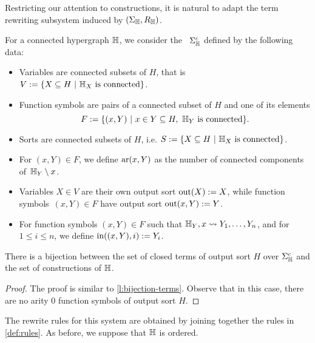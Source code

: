 Restricting our attention to constructions, it is natural to adapt the term rewriting subsystem induced by $(\Sigma_{\mathbb H},R_{\mathbb H})$.

\begin{definition}
  For a connected hypergraph ${\mathbb H}$, we consider the ~$\Sigma_{\mathbb H}^c$ defined by the following data:
  \begin{itemize}
    \item Variables are connected subsets of $H$, that is $V:=\{ X \subseteq H \ | \ \hyper{H}_{X} \text{ is connected}\}$. 
    \item Function symbols are pairs of a connected subset of $H$ and one of its elements 
    $$F:=\{(x,Y) \ | \ x \in Y \subseteq H, \ {\mathbb H}_Y \text{ is connected}\}.$$
    \item Sorts are connected subsets of $H$, i.e. 
    $S:=\{ X \subseteq H \ | \ {\mathbb H}_X \text{ is connected}\}$.
    \item For $(x,Y) \in F$, we define $\mathrm{ar}(x,Y)$ as the number of connected components of~${\mathbb H}_Y\setminus {x}$.
    \item Variables $X \in V$ are their own output sort $\operatorname{out}(X):=X$, while function symbols~$(x,Y) \in F$ have output sort $\operatorname{out}(x,Y):=Y$.
    \item For function symbols $(x,Y) \in F$ such that ${\mathbb H}_Y,x \leadsto Y_1,\ldots,Y_n$, and for $1 \leq i \leq n$, we define $\operatorname{in}((x,Y),i):=Y_i$.
  \end{itemize}
\end{definition}

\begin{lemma} 
  \label{l:bijection-constructions}
  There is a bijection between the set of closed terms of output sort $H$ over $\Sigma_{\mathbb H}^c$ and the set of constructions of ${\mathbb H}$.
\end{lemma}

\begin{proof}
  The proof is similar to \cref{l:bijection-terms}.
  Observe that in this case, there are no arity $0$ function symbols of output sort $H$. 
\end{proof}

The rewrite rules for this system are obtained by joining together the rules in \cref{def:rules}. 
As before, we suppose that ${\mathbb H}$ is ordered.

